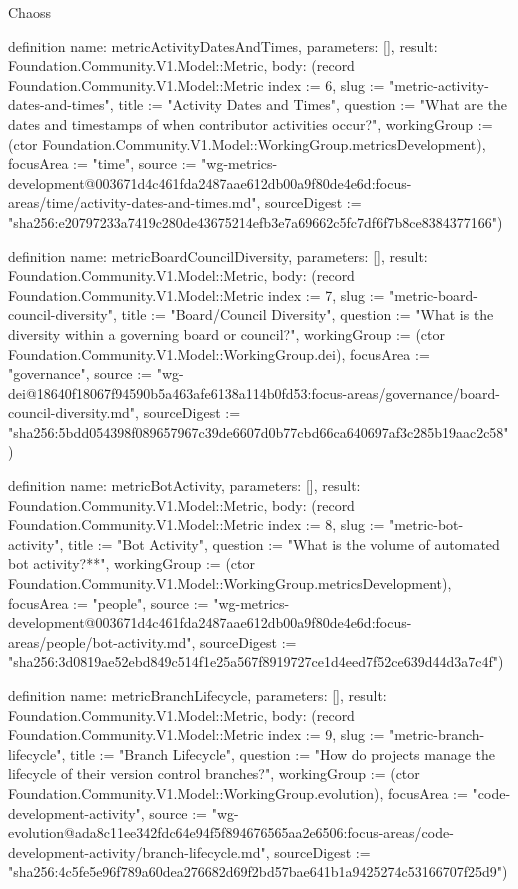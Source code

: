 \begin{lexlean}{Chaoss}
\begin{semanticmodule}
definition{
  name: metricActivityDatesAndTimes,
  parameters: [],
  result: Foundation.Community.V1.Model::Metric,
  body: (record Foundation.Community.V1.Model::Metric {index := 6, slug := "metric-activity-dates-and-times", title := "Activity Dates and Times", question := "What are the dates and timestamps of when contributor activities occur?", workingGroup := (ctor Foundation.Community.V1.Model::WorkingGroup.metricsDevelopment), focusArea := "time", source := "wg-metrics-development@003671d4c461fda2487aae612db00a9f80de4e6d:focus-areas/time/activity-dates-and-times.md", sourceDigest := "sha256:e20797233a7419c280de43675214efb3e7a69662c5fc7df6f7b8ce8384377166"})
}

definition{
  name: metricBoardCouncilDiversity,
  parameters: [],
  result: Foundation.Community.V1.Model::Metric,
  body: (record Foundation.Community.V1.Model::Metric {index := 7, slug := "metric-board-council-diversity", title := "Board/Council Diversity", question := "What is the diversity within a governing board or council?", workingGroup := (ctor Foundation.Community.V1.Model::WorkingGroup.dei), focusArea := "governance", source := "wg-dei@18640f18067f94590b5a463afe6138a114b0fd53:focus-areas/governance/board-council-diversity.md", sourceDigest := "sha256:5bdd054398f089657967c39de6607d0b77cbd66ca640697af3c285b19aac2c58"})
}

definition{
  name: metricBotActivity,
  parameters: [],
  result: Foundation.Community.V1.Model::Metric,
  body: (record Foundation.Community.V1.Model::Metric {index := 8, slug := "metric-bot-activity", title := "Bot Activity", question := "What is the volume of automated bot activity?**", workingGroup := (ctor Foundation.Community.V1.Model::WorkingGroup.metricsDevelopment), focusArea := "people", source := "wg-metrics-development@003671d4c461fda2487aae612db00a9f80de4e6d:focus-areas/people/bot-activity.md", sourceDigest := "sha256:3d0819ae52ebd849c514f1e25a567f8919727ce1d4eed7f52ce639d44d3a7c4f"})
}

definition{
  name: metricBranchLifecycle,
  parameters: [],
  result: Foundation.Community.V1.Model::Metric,
  body: (record Foundation.Community.V1.Model::Metric {index := 9, slug := "metric-branch-lifecycle", title := "Branch Lifecycle", question := "How do projects manage the lifecycle of their version control branches?", workingGroup := (ctor Foundation.Community.V1.Model::WorkingGroup.evolution), focusArea := "code-development-activity", source := "wg-evolution@ada8c11ee342fdc64e94f5f894676565aa2e6506:focus-areas/code-development-activity/branch-lifecycle.md", sourceDigest := "sha256:4c5fe5e96f789a60dea276682d69f2bd57bae641b1a9425274c53166707f25d9"})
}


\end{semanticmodule}
\end{lexlean}
